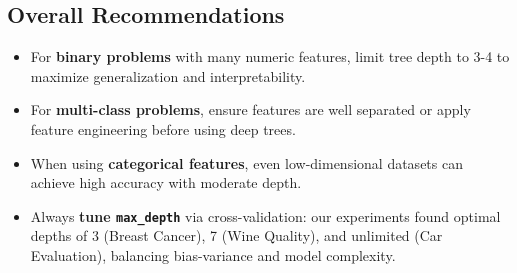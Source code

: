 \subsection{Overall Recommendations}
\begin{itemize}
	\item For \textbf{binary problems} with many numeric features, limit tree depth to 3-4 to maximize generalization and interpretability.
	\item For \textbf{multi-class problems}, ensure features are well separated or apply feature engineering before using deep trees.
	\item When using \textbf{categorical features}, even low-dimensional datasets can achieve high accuracy with moderate depth.
	\item Always \textbf{tune \texttt{max\_depth}} via cross-validation: our experiments found optimal depths of 3 (Breast Cancer), 7 (Wine Quality), and unlimited (Car Evaluation), balancing bias-variance and model complexity.
\end{itemize}
